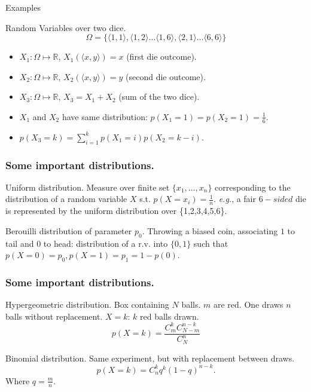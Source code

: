 \documentclass{beamer}
\begin{document}
\begin{frame}{Examples}
  \begin{exampleblock}{Random Variables over two dice.}
    \[\Omega = \{\langle 1,1 \rangle, \langle 1,2 \rangle \dots \langle 1,6 \rangle, \langle 2,1 \rangle \dots \langle 6,6 \rangle\}\]
    \begin{itemize}
    \item $X_1: \Omega \mapsto \mathbb{R}$, $X_1(\langle x,y \rangle) = x$ (first die outcome).
    \item $X_2: \Omega \mapsto \mathbb{R}$, $X_2(\langle x,y \rangle) = y$ (second die outcome).
    \item $X_3: \Omega \mapsto \mathbb{R}$, $X_3 = X_1 + X_2$ (sum of the two dice).
    \end{itemize}
  \end{exampleblock}

  \begin{itemize}
  \item $X_1$ and $X_2$ have same distribution: $p(X_1 = 1) = p(X_2 = 1) = \frac{1}{6}$.
  \item $p(X_3 = k) = \sum^{k}_{i=1} p(X_1 = i)p(X_2 = k - i)$. 
  \end{itemize}  
\end{frame}

\begin{frame}
  \frametitle{Some important distributions.}

  \begin{exampleblock}{Uniform distribution.}
    Measure over finite set $\{x_1, \dots, x_n\}$ corresponding to the distribution of a random variable $X$ s.t. $p(X = x_i) = \frac{1}{n}$. \emph{e.g.}, a fair $6-sided$ die is represented by the uniform distribution over \{1,2,3,4,5,6\}.
  \end{exampleblock}

  \begin{exampleblock}{Berouilli distribution of parameter $p_0$.}
    Throwing a biased coin, associating $1$ to tail and $0$ to head: distribution of a r.v. into $\{0, 1\}$ such that $p(X = 0) = p_0, p(X = 1) = p_1 = 1 - p(0)$.
  \end{exampleblock}
\end{frame}

\begin{frame}
  \frametitle{Some important distributions.}
  \begin{exampleblock}{Hypergeometric distribution.}
    Box containing $N$ balls. $m$ are red. One draws $n$ balls without replacement. $X = k$: $k$ red balls drawn.
    \[
    p(X = k) = \frac{C^k_mC^{n-k}_{N-m}}{C^n_N}
    \]
  
  \end{exampleblock}

  \begin{exampleblock}{Binomial distribution.}
    Same experiment, but with replacement between draws.
    \[
    p(X = k) = C^k_nq^{k}(1 - q)^{n-k}.
    \]
    Where $q = \frac{m}{n}$.
  \end{exampleblock}
  
\end{frame}
\end{document}
